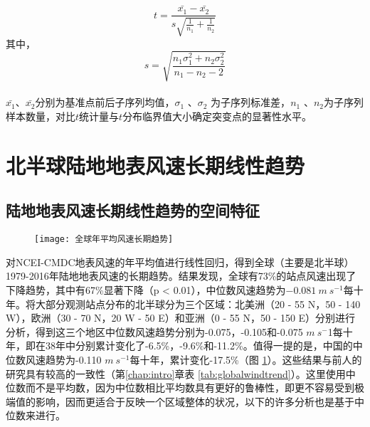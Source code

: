 \begin{equation} \label{eq:mvttest}
t = \frac{\bar{x_{1}} - \bar{x_{2}}}{ s \sqrt{\frac{1}{n_{1}} + \frac{1}{n_{2}}}}
\end{equation} 
其中，
\begin{equation} 
s = \sqrt{\frac{n_{1}\sigma_{1}^{2} + n_{2}\sigma_{2}^{2}}{n_{1} - n_{2} - 2}}
\end{equation} ~\\
$\bar{x_{1}}$、$\bar{x_{2}}$分别为基准点前后子序列均值，$\sigma_{1}$ 、$\sigma_{2}$  为子序列标准差，$n_{1}$ 、$n_{2}$为子序列样本数量，对比$t$统计量与$t$分布临界值大小确定突变点的显著性水平。

\section{北半球陆地地表风速长期线性趋势}\label{sec:NHwindchange}

\subsection{陆地地表风速长期线性趋势的空间特征}

\begin{figure}[!b]
    \centering
    \texttt{[image: 全球年平均风速长期趋势]}
    \label{fig:NHwindtrend}
\end{figure}

对NCEI-CMDC地表风速的年平均值进行线性回归，得到全球（主要是北半球）1979-2016年陆地地表风速的长期趋势。结果发现，全球有73\%的站点风速出现了下降趋势，其中有67\%显著下降（p < 0.01），中位数风速趋势为$ -0.081 ~ m ~ s^{-1}$每十年。将大部分观测站点分布的北半球分为三个区域：北美洲（20 - 55 N，50 - 140 W），欧洲（30 - 70 N，20 W - 50 E）和亚洲（0 - 55 N，50 - 150 E）分别进行分析，得到这三个地区中位数风速趋势分别为-0.075，-0.105和-0.075 $m ~ s^{-}$1每十年，即在38年中分别累计变化了-6.5\%，-9.6\%和-11.2\%。值得一提的是，中国的中位数风速趋势为-0.110 $m ~ s^{-1}$每十年，累计变化-17.5\%（图 \ref{fig:NHwindtrend}）。这些结果与前人的研究具有较高的一致性（第\ref{chap:intro}章\;表 \ref{tab:globalwindtrend}）。这里使用中位数而不是平均数，因为中位数相比平均数具有更好的鲁棒性，即更不容易受到极端值的影响，因而更适合于反映一个区域整体的状况，以下的许多分析也是基于中位数来进行。


